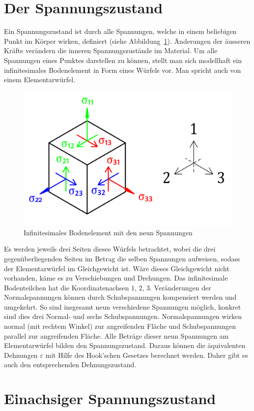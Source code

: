 \section{Der Spannungszustand\label{spannung:section:Der Spannungsustand}}
Ein Spannungszustand ist durch alle Spannungen, welche in einem beliebigen Punkt im Körper wirken, definiert (siehe Abbildung~\ref{fig:Bild2}).
Änderungen der äusseren Kräfte verändern die inneren Spannungszustände im Material.
Um alle Spannungen eines Punktes darstellen zu können,
stellt man sich modellhaft ein infinitesimales Bodenelement in Form eines Würfels vor.
Man spricht auch von einem Elementarwürfel.

\begin{figure}
	\centering
	\includegraphics[width=0.4\linewidth,keepaspectratio]{papers/spannung/Grafiken/Bild2.png}
	\caption{Infinitesimales Bodenelement mit den neun Spannungen}
	\label{fig:Bild2}
\end{figure}

Es werden jeweils drei Seiten dieses Würfels betrachtet, wobei die drei gegenüberliegenden Seiten im Betrag die selben Spannungen aufweisen,
sodass der Elementarwürfel im Gleichgewicht ist.
Wäre dieses Gleichgewicht nicht vorhanden, käme es zu Verschiebungen und Drehungen.
Das infinitesimale Bodenteilchen hat die Koordinatenachsen $1$, $2$, $3$.
%
%
Veränderungen der Normalspannungen können durch Schubspannungen kompensiert werden und umgekehrt.
So sind insgesamt neun verschiedene Spannungen möglich, konkret sind dies drei Normal- und sechs Schubspannungen.
Normalspannungen wirken normal (mit rechtem Winkel) zur angreifenden Fläche und Schubspannungen parallel zur angreifenden Fläche.
Alle Beträge dieser neun Spannungen am Elementarwürfel bilden den Spannungszustand.
Daraus können die äquivalenten Dehnungen $\varepsilon$ mit Hilfe des Hook'schen Gesetzes berechnet werden.
Daher gibt es auch den entsprechenden Dehnungszustand.


\section{Einachsiger Spannungszustand\label{spannung:section:Spannungsustand}}

